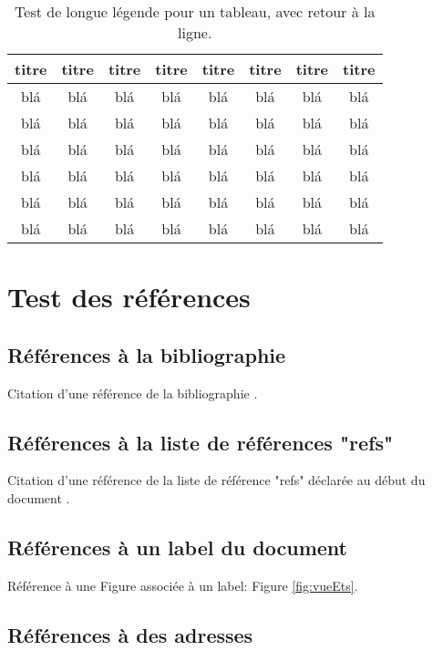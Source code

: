 \documentclass[letterpaper%
, twoside%
, 12pt%
,these%
,french
,creativecommons,hyperref,withAlgo2e%
]{thETS}
\begin{document}
\begin{table}
		\parbox{0.65\textwidth}{\caption{Test de longue légende pour un tableau, avec retour à la ligne.}} %
		\begin{tabular}{|c|c|c|c|c|c|c|c|}
		\hline
			{\bf titre} & {\bf titre} & {\bf titre} & {\bf titre} & {\bf titre} & {\bf titre} & {\bf titre} & {\bf titre} \\
	  \hline
			blá & blá & blá & blá & blá & blá & blá & blá \\
	  \hline
			blá & blá & blá & blá & blá & blá & blá & blá \\
	  \hline
			blá & blá & blá & blá & blá & blá & blá & blá \\
	  \hline
			blá & blá & blá & blá & blá & blá & blá & blá \\
	  \hline
			blá & blá & blá & blá & blá & blá & blá & blá \\
	  \hline
			blá & blá & blá & blá & blá & blá & blá & blá \\
	  \hline
		\end{tabular}
\end{table}


\section{Test des références}

\subsection{Références à la bibliographie}

Citation d'une référence de la bibliographie \citep{BookExample}.

\subsection{Références à la liste de références "refs"}

Citation d'une référence de la liste de référence "refs" déclarée au début du document .

\subsection{Références à un label du document}

Référence à une Figure associée à un label: Figure \ref{fig:vueEts}.

\subsection{Références à des adresses}
\end{document}

